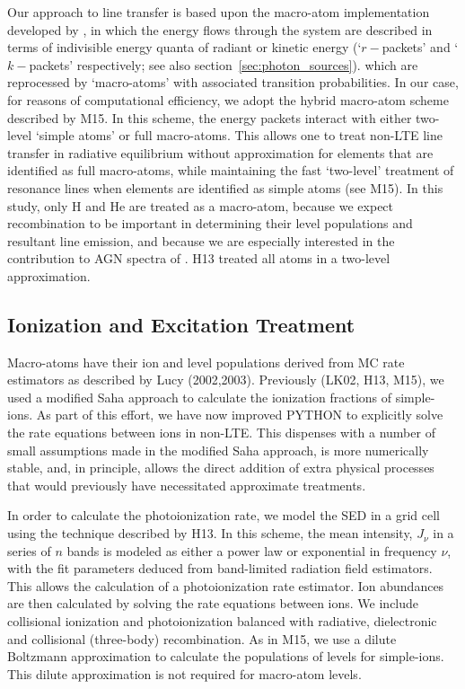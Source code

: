 \documentclass[useAMS,usenatbib]{mn2e_x}
\begin{document}
Our approach to line transfer is based upon the macro-atom implementation developed by 
\cite{lucy2002, lucy2003}, in which the energy flows through the system are described in 
terms of indivisible energy quanta of radiant or kinetic energy 
(`$r-$packets' and `$k-$packets' respectively; see also section~\ref{sec:photon_sources}). 
which are reprocessed by `macro-atoms' with associated transition probabilities.
In our case, for reasons of computational efficiency, we adopt the  hybrid macro-atom scheme 
described by M15. In this scheme, the energy packets interact with either two-level 
`simple atoms' or full macro-atoms. 
This allows one to treat non-LTE line transfer in radiative equilibrium
without approximation for elements that are identified as 
full macro-atoms, while maintaining the fast `two-level' 
treatment of resonance lines when elements are identified 
as simple atoms (see M15). In this study,
only H and He are treated as a macro-atom, because 
we expect recombination to be important
in determining their level populations and resultant line emission, 
and because we are especially interested in the contribution to 
AGN spectra of \LA.  H13 treated all atoms in a two-level approximation.  

\subsection{Ionization and Excitation Treatment}

Macro-atoms have their ion and level populations derived from
MC rate estimators as described by Lucy (2002,2003). 
Previously (LK02, H13, M15), we used a modified Saha approach to 
calculate the ionization fractions
of simple-ions. As part of  this effort, we have 
now improved {\sc PYTHON} to explicitly solve the 
rate equations between ions in non-LTE. This dispenses with a number of small assumptions 
made in the modified Saha approach, is more numerically stable, and, in principle, allows 
the direct addition of extra physical processes that would previously have necessitated 
approximate treatments.

In order to calculate the photoionization rate, 
we model the SED in a grid cell using the technique described by H13. In this scheme,
the mean intensity, $J_{\nu}$ in a series of $n$ bands is modeled as either a power law or exponential
in frequency $\nu$, with the fit parameters deduced from band-limited radiation field estimators.
This allows the calculation of a photoionization rate estimator. Ion abundances are
then calculated by solving the rate equations between ions. We include collisional ionization and photoionization balanced with radiative, 
dielectronic and collisional (three-body) recombination.
As in M15, we use a dilute Boltzmann approximation to calculate 
the populations of levels for simple-ions. This dilute approximation 
is not required for macro-atom levels. 
\end{document}
